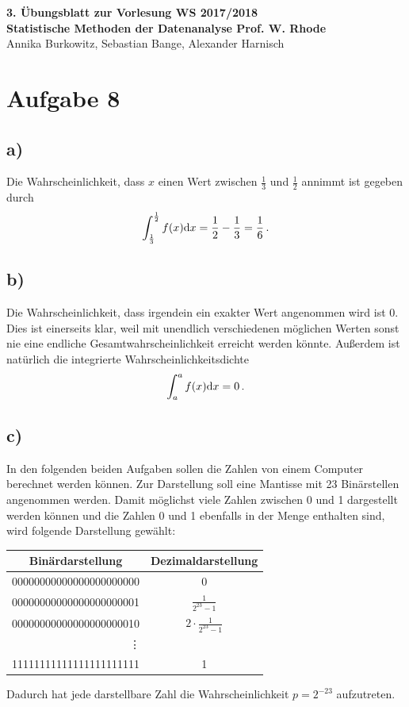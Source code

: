 \documentclass[a4paper, 11pt]{article}
\begin{document}
\noindent
\large{\textbf{3. Übungsblatt zur Vorlesung \hfill WS 2017/2018 \\
Statistische Methoden der Datenanalyse \hfill Prof. W. Rhode}} \\
Annika Burkowitz, Sebastian Bange, Alexander Harnisch \\
\noindent\makebox[\linewidth]{\rule{\textwidth}{0.4pt}}

\section*{Aufgabe 8}
\subsection*{a)}
Die Wahrscheinlichkeit, dass $x$ einen Wert zwischen $\frac{1}{3}$ und $\frac{1}{2}$ annimmt ist gegeben durch
\begin{equation}
    \int_{\frac{1}{3}}^{\frac{1}{2}} f(x) \textup{d}x = \frac{1}{2} - \frac{1}{3} = \frac{1}{6} \,.
\end{equation}

\subsection*{b)}
Die Wahrscheinlichkeit, dass irgendein ein exakter Wert angenommen wird ist 0. Dies ist einerseits klar, weil mit unendlich verschiedenen möglichen Werten sonst nie eine endliche Gesamtwahrscheinlichkeit erreicht werden könnte. Außerdem ist natürlich die integrierte Wahrscheinlichkeitsdichte
\begin{equation}
    \int_{a}^{a} f(x) \textup{d}x = 0 \,.
\end{equation}

\subsection*{c)}
In den folgenden beiden Aufgaben sollen die Zahlen von einem Computer berechnet werden können.
Zur Darstellung soll eine Mantisse mit 23 Binärstellen angenommen werden.
Damit möglichst viele Zahlen zwischen 0 und 1 dargestellt werden können und die Zahlen 0 und 1 ebenfalls in der Menge enthalten sind, wird folgende Darstellung gewählt:
\begin{center}
    \begin{tabular}{c|c}
        Binärdarstellung & Dezimaldarstellung \\
        \toprule
        00000000000000000000000 & 0 \\
        00000000000000000000001 & $\frac{1}{2^{23} - 1}$ \\
        00000000000000000000010 & $2\cdot\frac{1}{2^{23} - 1}$ \\
        \multicolumn{2}{c}{\vdots} \\
        11111111111111111111111 & 1 \\
    \end{tabular}
\end{center}
Dadurch hat jede darstellbare Zahl die Wahrscheinlichkeit $p = 2^{-23}$ aufzutreten.
\end{document}
